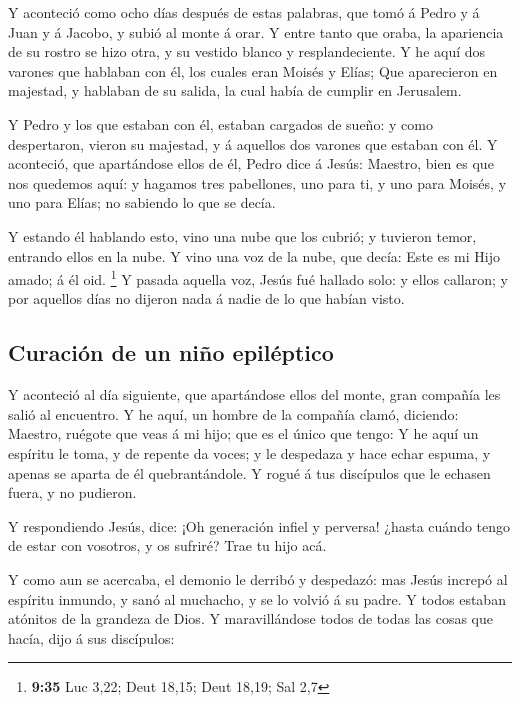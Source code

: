  Y aconteció como ocho días después de estas palabras, que
tomó á Pedro y á Juan y á Jacobo, y subió al monte á orar. 
Y entre tanto que oraba, la apariencia de su rostro se hizo otra, y su
vestido blanco y resplandeciente.  Y he aquí dos varones
que hablaban con él, los cuales eran Moisés y Elías;  Que
aparecieron en majestad, y hablaban de su salida, la cual había de
cumplir en Jerusalem.

 Y Pedro y los que estaban con él, estaban cargados de
sueño: y como despertaron, vieron su majestad, y á aquellos dos varones
que estaban con él.  Y aconteció, que apartándose ellos de
él, Pedro dice á Jesús: Maestro, bien es que nos quedemos aquí: y
hagamos tres pabellones, uno para ti, y uno para Moisés, y uno para
Elías; no sabiendo lo que se decía.

 Y estando él hablando esto, vino una nube que los cubrió;
y tuvieron temor, entrando ellos en la nube.  Y vino una
voz de la nube, que decía: Este es mi Hijo amado; á él oid. \footnote{\textbf{9:35}
  Luc 3,22; Deut 18,15; Deut 18,19; Sal 2,7}  Y pasada
aquella voz, Jesús fué hallado solo: y ellos callaron; y por aquellos
días no dijeron nada á nadie de lo que habían visto.

\hypertarget{curaciuxf3n-de-un-niuxf1o-epiluxe9ptico}{%
\subsection{Curación de un niño
epiléptico}\label{curaciuxf3n-de-un-niuxf1o-epiluxe9ptico}}

 Y aconteció al día siguiente, que apartándose ellos del
monte, gran compañía les salió al encuentro.  Y he aquí, un
hombre de la compañía clamó, diciendo: Maestro, ruégote que veas á mi
hijo; que es el único que tengo:  Y he aquí un espíritu le
toma, y de repente da voces; y le despedaza y hace echar espuma, y
apenas se aparta de él quebrantándole.  Y rogué á tus
discípulos que le echasen fuera, y no pudieron.

 Y respondiendo Jesús, dice: ¡Oh generación infiel y
perversa! ¿hasta cuándo tengo de estar con vosotros, y os sufriré? Trae
tu hijo acá.

 Y como aun se acercaba, el demonio le derribó y despedazó:
mas Jesús increpó al espíritu inmundo, y sanó al muchacho, y se lo
volvió á su padre.  Y todos estaban atónitos de la grandeza
de Dios. Y maravillándose todos de todas las cosas que hacía, dijo á sus
discípulos:

